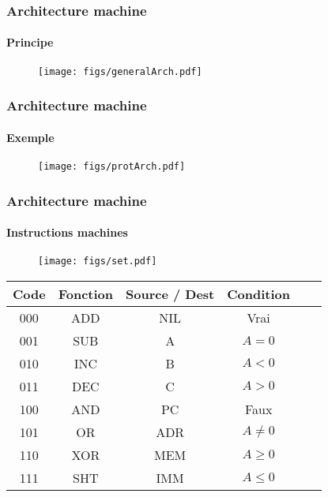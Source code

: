 
\begin{frame}

  \frametitle{Architecture machine}
  \framesubtitle{Principe}
  

  \begin{figure}
    \centering
    \texttt{[image: figs/generalArch.pdf]}
  \end{figure}



\end{frame}


\begin{frame}

  \frametitle{Architecture machine}
  \framesubtitle{Exemple}

  \begin{figure}
    \centering
    \texttt{[image: figs/protArch.pdf]}
  \end{figure}

\end{frame}


\begin{frame}

  \frametitle{Architecture machine}
  \framesubtitle{Instructions machines}

  \begin{figure}
    \centering
    \texttt{[image: figs/set.pdf]}
  \end{figure}

  \bigskip

  \begin{center}
    \begin{tabular}{ |c||c|c|c|c|c| }
     \hline
     Code & Fonction & Source / Dest & Condition \\
     \hline
     000  & ADD & NIL & Vrai\\
     \hline
     001  & SUB & A   & $A=0$\\
     \hline
     010  & INC & B   & $A<0$\\
     \hline
     011  & DEC & C   & $A>0$\\
     \hline
     100  & AND & PC  & Faux\\
     \hline
     101  & OR  & ADR & $A\neq0$\\
     \hline
     110  & XOR & MEM & $A\geq0$\\
     \hline
     111  & SHT & IMM & $A\leq0$\\
     \hline
    \end{tabular}
  \end{center}



\end{frame}
